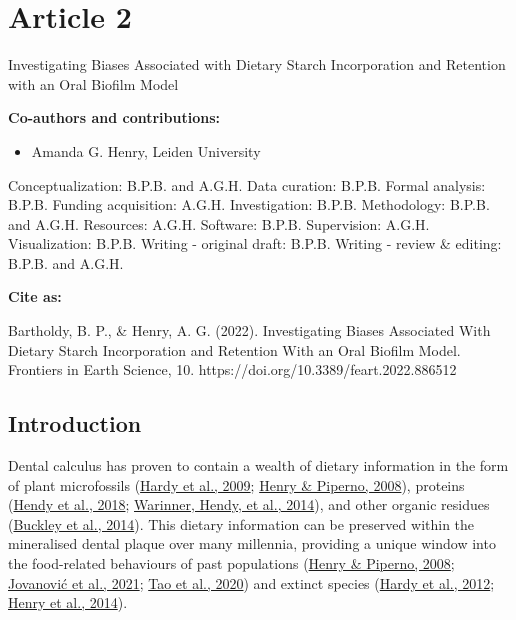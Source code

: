\documentclass[
  b5paper,
]{book}
\providecommand{\tightlist}{%
  \setlength{\itemsep}{0pt}\setlength{\parskip}{0pt}}
\begin{document}

\hypertarget{article-2}{%
\chapter{Article 2}\label{article-2}}

Investigating Biases Associated with Dietary Starch Incorporation and
Retention with an Oral Biofilm Model

\hfill\break

\footnotesize

\textbf{Co-authors and contributions:}

\begin{itemize}
\tightlist
\item
  Amanda G. Henry, Leiden University
\end{itemize}

Conceptualization: B.P.B. and A.G.H. Data curation: B.P.B. Formal
analysis: B.P.B. Funding acquisition: A.G.H. Investigation: B.P.B.
Methodology: B.P.B. and A.G.H. Resources: A.G.H. Software: B.P.B.
Supervision: A.G.H. Visualization: B.P.B. Writing - original draft:
B.P.B. Writing - review \& editing: B.P.B. and A.G.H.

\textbf{Cite as:}

Bartholdy, B. P., \& Henry, A. G. (2022). Investigating Biases
Associated With Dietary Starch Incorporation and Retention With an Oral
Biofilm Model. Frontiers in Earth Science, 10.
https://doi.org/10.3389/feart.2022.886512

\normalsize

\newpage{}

\hypertarget{byocstarch-intro}{%
\section{Introduction}\label{byocstarch-intro}}

Dental calculus has proven to contain a wealth of dietary information in
the form of plant microfossils
(\protect\hyperlink{ref-hardyStarchGranules2009}{Hardy et al., 2009};
\protect\hyperlink{ref-henryCalculusSyria2008}{Henry \& Piperno, 2008}),
proteins (\protect\hyperlink{ref-hendyProteomicCalculus2018}{Hendy et
al., 2018}; \protect\hyperlink{ref-warinnerEvidenceMilk2014}{Warinner,
Hendy, et al., 2014}), and other organic residues
(\protect\hyperlink{ref-buckleyDentalCalculus2014}{Buckley et al.,
2014}). This dietary information can be preserved within the mineralised
dental plaque over many millennia, providing a unique window into the
food-related behaviours of past populations
(\protect\hyperlink{ref-henryCalculusSyria2008}{Henry \& Piperno, 2008};
\protect\hyperlink{ref-jovanovicNeolithicCalculus2021}{Jovanović et al.,
2021}; \protect\hyperlink{ref-taoWheatCalculus2020}{Tao et al., 2020})
and extinct species
(\protect\hyperlink{ref-hardyNeanderthalMedics2012}{Hardy et al., 2012};
\protect\hyperlink{ref-henryNeanderthalCalculus2014}{Henry et al.,
2014}).
\end{document}
